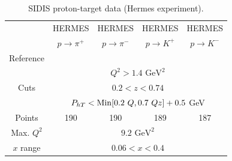 \documentclass[aps,preprintnumbers,showpacs,nofootinbib,superscriptaddress,floatfix]{revtex4}
\newcommand{\Tperp}{T}
\begin{document}
\begin{table}[h!]
\begin{center}
\begin{tabular}{|c|c|c|c|c|}
 \hline
  & HERMES & HERMES & HERMES & HERMES \\
 ~          &  $p \to \pi^+$    &   $p \to \pi^-$    &  $p \to K^+$    &   $p \to K^-$               \\
 \hline
 Reference & \multicolumn{4}{c|}{\cite{Airapetian:2012ki}}        \\
\hline
\multirow{3}{*}{Cuts}             & \multicolumn{4}{c|}{$Q^2 > 1.4 \text{ GeV}^2$}     \\
             & \multicolumn{4}{c|}{$0.2 <z <0.74$}     \\
             & \multicolumn{4}{c|}{$P_{h \Tperp}< {\rm Min}[0.2\ Q, 0.7 \ Q z ] +0.5$ GeV}     \\
\hline
 Points         &  190 & 190 & 189 & 187       \\
 \hline
Max. $Q^2$      &  \multicolumn{4}{c|}{$9.2 \text{ GeV}^2 $}               \\
 \hline
$x$ range       & \multicolumn{4}{c|}{$0.06 < x < 0.4$ }                \\
\hline
\end{tabular}
\caption{SIDIS proton-target data (Hermes experiment).}
\label{t:data_SIDIS_proton}
\end{center}
\end{table}
\end{document}

